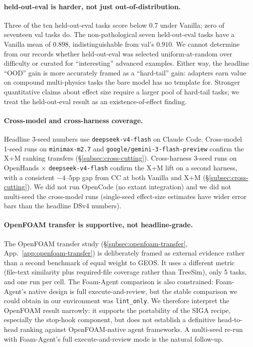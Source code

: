 \documentclass{article}
\begin{document}
\paragraph{held-out-eval is harder, not just out-of-distribution.}
Three of the ten held-out-eval tasks score below 0.7 under Vanilla; zero of seventeen val tasks do. The non-pathological seven held-out-eval tasks have a Vanilla mean of $0.898$, indistinguishable from val's $0.910$. We cannot determine from our records whether held-out-eval was selected uniform-at-random over difficulty or curated for ``interesting'' advanced examples. Either way, the headline ``OOD'' gain is more accurately framed as a ``hard-tail'' gain: adapters earn value on compound multi-physics tasks the bare model has no template for. Stronger quantitative claims about effect size require a larger pool of hard-tail tasks; we treat the held-out-eval result as an existence-of-effect finding.

\paragraph{Cross-model and cross-harness coverage.}
Headline 3-seed numbers use \texttt{deepseek-v4-flash} on Claude Code. Cross-model 1-seed runs on \texttt{minimax-m2.7} and \texttt{google/gemini-3-flash-preview} confirm the X+M ranking transfers (\S\ref{subsec:cross-cutting}). Cross-harness 3-seed runs on OpenHands × \texttt{deepseek-v4-flash} confirm the X+M lift on a second harness, with a consistent $-4$--$5$pp gap from CC at both Vanilla and X+M (\S\ref{subsec:cross-cutting}). We did not run OpenCode (no extant integration) and we did not multi-seed the cross-model runs (single-seed effect-size estimates have wider error bars than the headline DSv4 numbers).

\paragraph{OpenFOAM transfer is supportive, not headline-grade.}
The OpenFOAM transfer study (\S\ref{subsec:openfoam-transfer}, App.~\ref{app:openfoam-transfer}) is deliberately framed as external evidence rather than a second benchmark of equal weight to GEOS. It uses a different metric (file-text similarity plus required-file coverage rather than TreeSim), only 5 tasks, and one run per cell. The Foam-Agent comparison is also constrained: Foam-Agent's native design is full execute-and-review, but the stable comparison we could obtain in our environment was \texttt{lint\_only}. We therefore interpret the OpenFOAM result narrowly: it supports the portability of the SIGA recipe, especially the stop-hook component, but does not establish a definitive head-to-head ranking against OpenFOAM-native agent frameworks. A multi-seed re-run with Foam-Agent's full execute-and-review mode is the natural follow-up.
\end{document}
